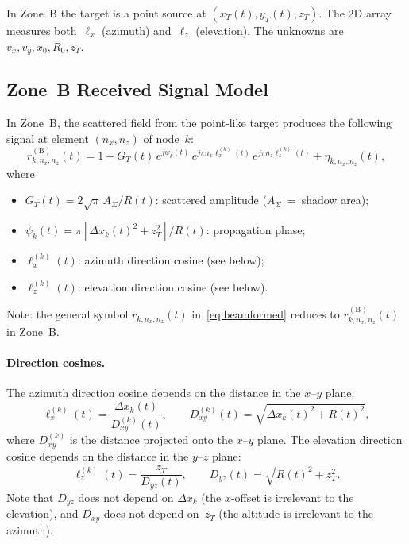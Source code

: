 \documentclass[11pt,a4paper]{article}
\begin{document}
In Zone~B the target is a point source at $(x_T(t),y_T(t),z_T)$.
The 2D array measures both~$\ell_x$ (azimuth) and~$\ell_z$
(elevation).  The unknowns are $v_x,v_y,x_0,R_0,z_T$.

\subsection{Zone~B Received Signal Model}

In Zone~B, the scattered field from the point-like target produces
the following signal at element $(n_x,n_z)$ of node~$k$:
\begin{equation}
  r_{k,n_x,n_z}^{(\mathrm{B})}(t) = 1+G_T(t)\,e^{j\psi_k(t)}\,
  e^{j\pi n_x\ell_x^{(k)}(t)}\,
  e^{j\pi n_z\ell_z^{(k)}(t)}+\eta_{k,n_x,n_z}(t),
  \label{eq:rx_signal_B}
\end{equation}
where
\begin{itemize}
  \item $G_T(t)=2\sqrt{\pi}\,A_\Sigma/R(t)$: scattered amplitude
    ($A_\Sigma$~=~shadow area);
  \item $\psi_k(t)=\pi[\Delta x_k(t)^2+z_T^2]/R(t)$: propagation
    phase;
  \item $\ell_x^{(k)}(t)$: azimuth direction cosine (see below);
  \item $\ell_z^{(k)}(t)$: elevation direction cosine (see below).
\end{itemize}
Note: the general symbol $r_{k,n_x,n_z}(t)$
in~\eqref{eq:beamformed} reduces to
$r_{k,n_x,n_z}^{(\mathrm{B})}(t)$ in Zone~B.

\paragraph{Direction cosines.}
The azimuth direction cosine depends on the distance in the
$x$--$y$ plane:
\begin{equation}
  \ell_x^{(k)}(t)=\frac{\Delta x_k(t)}{D_{xy}^{(k)}(t)},
  \qquad
  D_{xy}^{(k)}(t) = \sqrt{\Delta x_k(t)^2+R(t)^2},
  \label{eq:lx_def}
\end{equation}
where $D_{xy}^{(k)}$ is the distance projected onto the $x$--$y$
plane.  The elevation direction cosine depends on the distance in
the $y$--$z$ plane:
\begin{equation}
  \ell_z^{(k)}(t)=\frac{z_T}{D_{yz}(t)},
  \qquad
  D_{yz}(t) = \sqrt{R(t)^2+z_T^2}.
  \label{eq:lz_def}
\end{equation}
Note that $D_{yz}$ does not depend on $\Delta x_k$ (the $x$-offset
is irrelevant to the elevation), and $D_{xy}$ does not depend
on~$z_T$ (the altitude is irrelevant to the azimuth).
\end{document}
